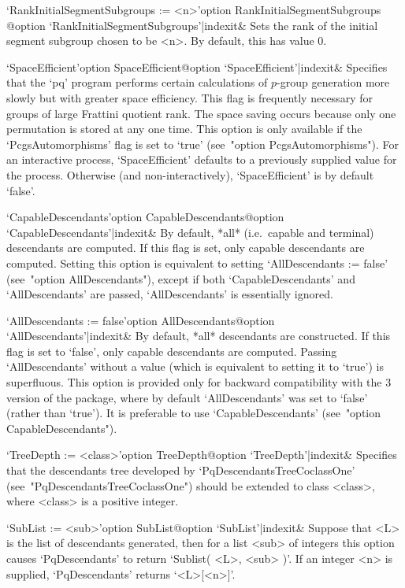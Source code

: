 \>`RankInitialSegmentSubgroups := <n>'{option RankInitialSegmentSubgroups}%
@{option `RankInitialSegmentSubgroups'|indexit}&
Sets the rank of the initial  segment  subgroup  chosen  to  be  <n>.  By
default, this has value 0.

\>`SpaceEfficient'{option SpaceEfficient}@{option `SpaceEfficient'|indexit}&
Specifies that the `pq' program performs certain calculations of $p$-group
generation more slowly  but with greater space efficiency.   This flag is
frequently  necessary for groups  of large  Frattini quotient  rank.  The
space saving  occurs because  only one permutation  is stored at  any one
time. This  option is only  available if the `PcgsAutomorphisms'  flag is
set  to  `true'  (see~"option  PcgsAutomorphisms").  For  an  interactive
process, `SpaceEfficient' defaults to a previously supplied value for the
process.   Otherwise  (and  non-interactively),  `SpaceEfficient'  is  by
default `false'.

\>`CapableDescendants'{option CapableDescendants}@{option `CapableDescendants'|indexit}&
By default, *all* (i.e.~capable and terminal) descendants  are  computed.
If this flag is set, only capable descendants are computed. Setting  this
option is equivalent to setting `AllDescendants  :=  false'  (see~"option
AllDescendants"),    except    if    both    `CapableDescendants'     and
`AllDescendants' are passed, `AllDescendants' is essentially ignored.
\goodbreak%

\>`AllDescendants := false'{option AllDescendants}@{option `AllDescendants'|indexit}&
By default, *all* descendants are constructed. If this  flag  is  set  to
`false', only capable descendants are computed. Passing  `AllDescendants'
without a value  (which  is  equivalent  to  setting  it  to  `true')  is
superfluous. This option is provided only for backward compatibility with
the  {\GAP}  3  version  of  the  {\ANUPQ}  package,  where  by   default
`AllDescendants'  was  set  to  `false'  (rather  than  `true').  It   is
preferable to use `CapableDescendants' (see~"option CapableDescendants").

\>`TreeDepth := <class>'{option TreeDepth}@{option `TreeDepth'|indexit}&
Specifies     that     the     descendants     tree     developed      by
`PqDescendantsTreeCoclassOne' (see~"PqDescendantsTreeCoclassOne")  should
be extended to class <class>, where <class> is a positive integer.

\>`SubList := <sub>'{option SubList}@{option `SubList'|indexit}&
Suppose that <L> is the list of descendants generated, then  for  a  list
<sub> of integers this option causes `PqDescendants' to return  `Sublist(
<L>, <sub> )'. If an integer <n>  is  supplied,  `PqDescendants'  returns
`<L>[<n>]'.

